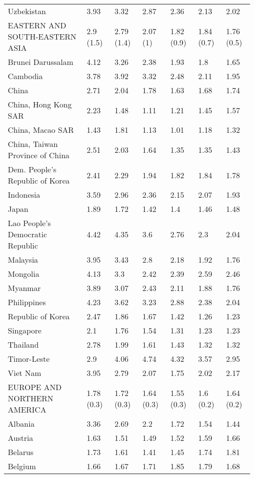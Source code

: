 \begin{longtable}[t]{lllllll}
Uzbekistan & 3.93 & 3.32 & 2.87 & 2.36 & 2.13 & 2.02\\
EASTERN AND SOUTH-EASTERN ASIA & 2.9 (1.5) & 2.79 (1.4) & 2.07 (1) & 1.82 (0.9) & 1.84 (0.7) & 1.76 (0.5)\\
Brunei Darussalam & 4.12 & 3.26 & 2.38 & 1.93 & 1.8 & 1.65\\
Cambodia & 3.78 & 3.92 & 3.32 & 2.48 & 2.11 & 1.95\\
China & 2.71 & 2.04 & 1.78 & 1.63 & 1.68 & 1.74\\
China, Hong Kong SAR & 2.23 & 1.48 & 1.11 & 1.21 & 1.45 & 1.57\\
China, Macao SAR & 1.43 & 1.81 & 1.13 & 1.01 & 1.18 & 1.32\\
China, Taiwan Province of China & 2.51 & 2.03 & 1.64 & 1.35 & 1.35 & 1.43\\
Dem. People's Republic of Korea & 2.41 & 2.29 & 1.94 & 1.82 & 1.84 & 1.78\\
Indonesia & 3.59 & 2.96 & 2.36 & 2.15 & 2.07 & 1.93\\
Japan & 1.89 & 1.72 & 1.42 & 1.4 & 1.46 & 1.48\\
Lao People's Democratic Republic & 4.42 & 4.35 & 3.6 & 2.76 & 2.3 & 2.04\\
Malaysia & 3.95 & 3.43 & 2.8 & 2.18 & 1.92 & 1.76\\
Mongolia & 4.13 & 3.3 & 2.42 & 2.39 & 2.59 & 2.46\\
Myanmar & 3.89 & 3.07 & 2.43 & 2.11 & 1.88 & 1.76\\
Philippines & 4.23 & 3.62 & 3.23 & 2.88 & 2.38 & 2.04\\
Republic of Korea & 2.47 & 1.86 & 1.67 & 1.42 & 1.26 & 1.23\\
Singapore & 2.1 & 1.76 & 1.54 & 1.31 & 1.23 & 1.23\\
Thailand & 2.78 & 1.99 & 1.61 & 1.43 & 1.32 & 1.32\\
Timor-Leste & 2.9 & 4.06 & 4.74 & 4.32 & 3.57 & 2.95\\
Viet Nam & 3.95 & 2.79 & 2.07 & 1.75 & 2.02 & 2.17\\
EUROPE AND NORTHERN AMERICA & 1.78 (0.3) & 1.72 (0.3) & 1.64 (0.3) & 1.55 (0.3) & 1.6 (0.2) & 1.64 (0.2)\\
Albania & 3.36 & 2.69 & 2.2 & 1.72 & 1.54 & 1.44\\
Austria & 1.63 & 1.51 & 1.49 & 1.52 & 1.59 & 1.66\\
Belarus & 1.73 & 1.61 & 1.41 & 1.45 & 1.74 & 1.81\\
Belgium & 1.66 & 1.67 & 1.71 & 1.85 & 1.79 & 1.68\\

\end{longtable}
